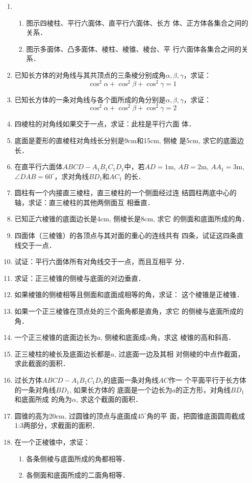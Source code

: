 \begin{enumerate}
    \item \begin{enumerate}
        \item 图示四棱柱、平行六面体、直平行六面体、长方
    体、正方体各集合之间的关系．
    \item 图示多面体、凸多面体、棱柱、棱锥、棱台、平
    行六面体各集合之间的关系．
    \end{enumerate}
   
    \item 已知长方体的对角线与其共顶点的三条棱分别成角$\alpha,\beta,\gamma$，求证：
    \[\cos^2\alpha+\cos^2\beta+\cos^2\gamma=1\]
    \item 已知长方体的一条对角线与各个面所成的角分别是$\alpha,\beta,\gamma$，求证：\[\cos^2\alpha+\cos^2\beta+\cos^2\gamma=2\]
    \item 四棱柱的对角线如果交于一点，求证：此柱是平行六面
    体．
    \item 底面是菱形的直棱柱对角线长分别是9cm和15cm, 侧棱
    是5cm, 求它的底面边长．
    \item 在直平行六面体$ABCD-A_1B_1C_1D_1$中，若$AD=1$m,
    $AB=2$m, $AA_1=3$m, $\angle DAB=60^{\circ}$，求对角线$BD_1$和$AC_1$
    的长．
    \item 圆柱有一个内接直三棱柱，直三棱柱的一个侧面经过连
    结圆柱两底中心的轴，求证：直三棱柱的其他两侧面互
    相垂直．
    \item 已知正六棱锥的底面边长是4cm, 侧棱长是8cm, 求它
    的侧面和底面所成的角．
    \item 四面体（三棱锥）的各顶点与其对面的重心的连线共有
    四条，试证这四条直线交于一点．

    \item 试证：平行六面体所有对角线交于一点，而且互相平
分．
\item 求证：正三棱锥的侧棱与底面的对边垂直．
\item 如果棱锥的侧棱相等且侧面和底面成相等的角，求证：
这个棱锥是正棱锥．
\item 如果一个正三棱锥在顶点处的三个面角都是直角，求它
的侧棱与底面所成的角．
\item 一个正三棱锥的底面边长为$a$, 侧棱和底面成$\alpha$角，求这
棱锥的高和斜高．
\item 正三棱柱的棱长及底面边长都是$a$, 过底面一边及其相
对侧棱的中点作截面，求此截面的面积．
\item 过长方体$ABCD-A_1B_1C_1D_1$的底面一条对角线$AC$作一
个平面平行于长方体的一条对角线$BD_1$, 如果长方体的
底面是一个边长为$a$的正方形，对角线$BD_1$和底面所成
的角为$\alpha$, 求这个截面的面积．
\item 圆锥的高为20cm, 过圆锥的顶点与底面成$45^{\circ}$角的平
面，把圆锥底面圆周截成1:3两部分，求截面的面积．
\item 在一个正棱锥中，求证：
\begin{enumerate}
    \item 各条侧棱与底面所成的角都相等．
    \item 各侧面和底面所成的二面角相等．
\end{enumerate}


\end{enumerate}
